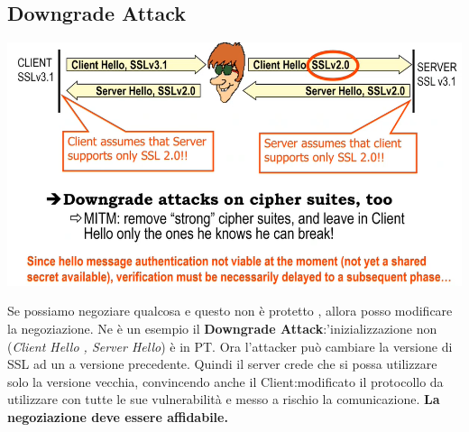 \documentclass{book}
\theoremstyle{remark}
\begin{document}
\subsection{Downgrade Attack}
\begin{center}
	\includegraphics*[scale=0.8]{2021-11-22-14-46-59.png}
\end{center}
Se possiamo negoziare qualcosa e questo non è protetto , allora posso modificare la negoziazione\@. Ne è un esempio
il \textbf{Downgrade Attack}:\@l'inizializzazione non (\emph{Client Hello , Server Hello}) è in PT\@. Ora l'attacker può cambiare la
versione di SSL ad un a versione precedente\@. Quindi il server crede che si possa utilizzare solo la versione vecchia, convincendo anche
il Client:\@abbiamo modificato il protocollo da utilizzare con tutte le sue vulnerabilità e messo a rischio la comunicazione\@.
\textbf{La negoziazione deve essere affidabile\@.}
\end{document}
